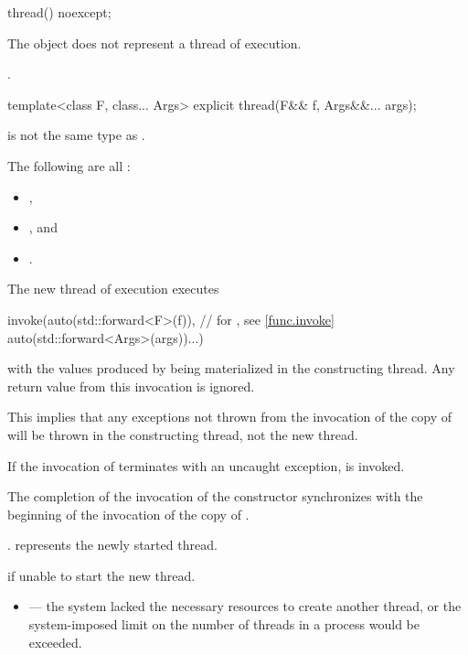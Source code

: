 %
\begin{itemdecl}
thread() noexcept;
\end{itemdecl}

\begin{itemdescr}
\pnum
\effects
The object does not represent a thread of execution.

\pnum
\ensures
{}.
\end{itemdescr}

%
\begin{itemdecl}
template<class F, class... Args> explicit thread(F&& f, Args&&... args);
\end{itemdecl}

\begin{itemdescr}
\pnum
\constraints
{} is not the same type as .

\pnum
\mandates
The following are all :
\begin{itemize}
\item {},
\item {}, and
\item {}.
\end{itemize}

\pnum
\effects
The new thread of execution executes
\begin{codeblock}
invoke(auto(std::forward<F>(f)),                // for , see \ref{func.invoke}
       auto(std::forward<Args>(args))...)
\end{codeblock}
with the values produced by 
being materialized in the constructing thread.
Any return value from this invocation is ignored.
\begin{note}
This implies that any exceptions not thrown from the invocation of the copy
of  will be thrown in the constructing thread, not the new thread.
\end{note}
If the invocation of  terminates with an uncaught exception,
 is invoked.

\pnum
\sync
The completion of the invocation of the constructor
synchronizes with the beginning of the invocation of the copy of .

\pnum
\ensures
{}.  represents the newly started thread.

\pnum
\throws
{} if unable to start the new thread.

\pnum
\errors
\begin{itemize}
\item {} --- the system lacked the necessary
resources to create another thread, or the system-imposed limit on the number of
threads in a process would be exceeded.
\end{itemize}
\end{itemdescr}

